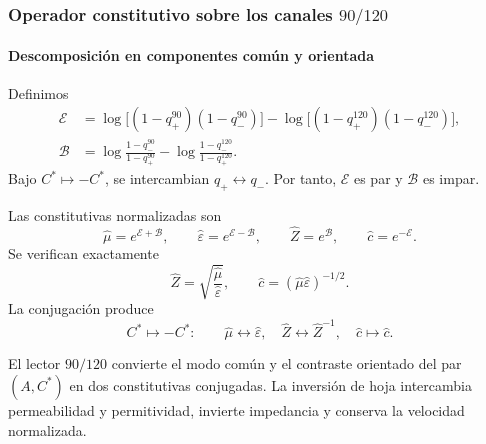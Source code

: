 \subsubsection{Operador constitutivo sobre los canales \(90/120\)}

\paragraph{Descomposición en componentes común y orientada}

Definimos
\begin{align}
\mathcal E
&=\log\bigl[(1-q_+^{90})(1-q_-^{90})\bigr]
-\log\bigl[(1-q_+^{120})(1-q_-^{120})\bigr],
\label{eq:Ecommon}\\
\mathcal B
&=\log\frac{1-q_-^{90}}{1-q_+^{90}}
-\log\frac{1-q_-^{120}}{1-q_+^{120}}.
\label{eq:Borient}
\end{align}
Bajo \(C^*\mapsto-C^*\), se intercambian \(q_+\leftrightarrow q_-\). Por
tanto, \(\mathcal E\) es par y \(\mathcal B\) es impar.

Las constitutivas normalizadas son
\begin{equation}
\widehat\mu=e^{\mathcal E+\mathcal B},
\qquad
\widehat\varepsilon=e^{\mathcal E-\mathcal B},
\qquad
\widehat Z=e^{\mathcal B},
\qquad
\widehat c=e^{-\mathcal E}.
\label{eq:constitutives}
\end{equation}
Se verifican exactamente
\begin{equation}
\widehat Z=\sqrt{\frac{\widehat\mu}{\widehat\varepsilon}},
\qquad
\widehat c=(\widehat\mu\widehat\varepsilon)^{-1/2}.
\label{eq:constitutive-identities}
\end{equation}
La conjugación produce
\begin{equation}
C^*\mapsto-C^*:\qquad
\widehat\mu\leftrightarrow\widehat\varepsilon,
\quad
\widehat Z\leftrightarrow\widehat Z^{-1},
\quad
\widehat c\mapsto\widehat c.
\label{eq:EM-conjugation}
\end{equation}

\begin{theorem}
El lector \(90/120\) convierte el modo común y el contraste orientado del
par \((A,C^*)\) en dos constitutivas conjugadas. La inversión de hoja
intercambia permeabilidad y permitividad, invierte impedancia y conserva la
velocidad normalizada.
\end{theorem}

